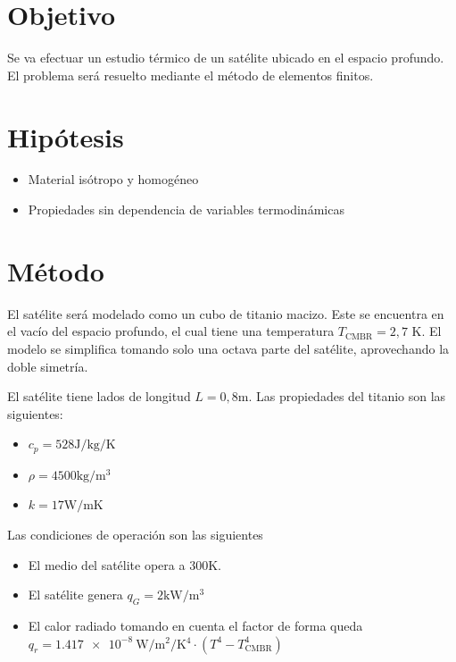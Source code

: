 \documentclass[onecolumn,10pt,titlepage,a4paper]{article}
\begin{document}
\newcommand{\xx}{{\mathrm{xx}}}
\newcommand{\xc}{{\mathrm{xc}}}
\newcommand{\cc}{{\mathrm{cc}}}
\newcommand{\sx}{{\mathrm{x}}}
\newcommand{\scc}{{\mathrm{c}}}

\section*{Objetivo}
Se va efectuar un estudio térmico de un satélite ubicado en el espacio profundo. El problema será resuelto mediante el método de elementos finitos.

\section*{Hipótesis}
\begin{itemize}
	\item Material isótropo y homogéneo
	\item Propiedades sin dependencia de variables termodinámicas
\end{itemize}


\section*{Método}

El satélite será modelado como un cubo de titanio macizo. Este se encuentra en el vacío del espacio profundo, el cual tiene una temperatura $T_{\mathrm{CMBR}}=2,7$ K. El modelo se simplifica tomando solo una octava parte del satélite, aprovechando la doble simetría. 

El satélite tiene lados de longitud $L=0,8$m. Las propiedades del titanio son las siguientes:
\begin{itemize}
	\item $c_p = 528 \si{\joule \per \kilogram \per \kelvin}$
	\item $\rho = 4500\si{\kilogram \per \meter \cubed }$
	\item $k = 17 \si{\watt \per \meter \kelvin}$
\end{itemize}

Las condiciones de operación son las siguientes
\begin{itemize}
	\item El medio del satélite opera a 300K.
	\item El satélite genera $q_{G}=2\si{\kilo \watt \per \meter \cubed}$
	\item El calor radiado tomando en cuenta el factor de forma queda $q_{r}=\SI{1,417e-8}{\watt \per \meter \squared \per \kelvin^4} \cdot \left( T^4 - T^4_{\mathrm{CMBR}} \right)$
\end{itemize}
\end{document}
